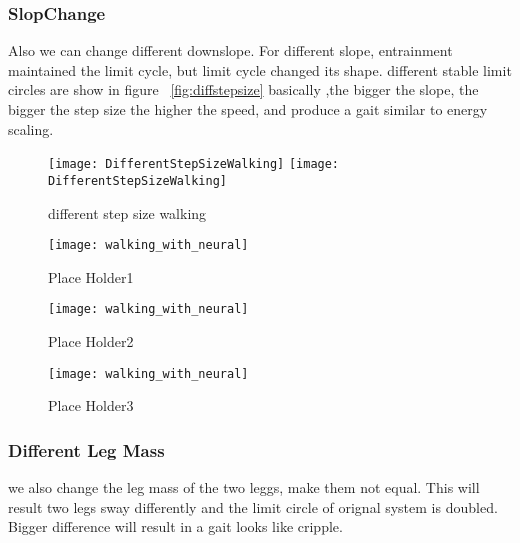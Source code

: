 \subsubsection*{SlopChange}
Also we can change different downslope.
For different slope, entrainment maintained the limit cycle, but limit cycle changed its shape.
different stable limit circles are show in figure ~\ref{fig:diffstepsize}
basically ,the bigger the slope, the bigger the step size the higher the speed, and produce a gait similar to energy scaling.

\begin{figure}[!htbp]
  \begin{center}
    \leavevmode
    \ifpdf
      \texttt{[image: DifferentStepSizeWalking]}
    \else
      \texttt{[image: DifferentStepSizeWalking]}
    \fi
    \caption{different step size walking}
    \label{fig:differentlr}
\end{center}
\end{figure}


\begin{figure}[!htbp]
  \begin{center}
      \texttt{[image: walking\_with\_neural]}
    \caption{Place Holder1}
    \label{fig:ss1}
\end{center}
\end{figure}

\begin{figure}[!htbp]
  \begin{center}
      \texttt{[image: walking\_with\_neural]}
    \caption{Place Holder2}
    \label{fig:ss2}
\end{center}
\end{figure}

\begin{figure}[!htbp]
  \begin{center}
      \texttt{[image: walking\_with\_neural]}
    \caption{Place Holder3}
    \label{fig:ss3}
\end{center}
\end{figure}




\subsubsection*{Different Leg Mass}
we also change the leg mass of the two leggs, make them not equal.
This will result two legs sway differently and the limit circle of orignal system is doubled.
Bigger difference will result in a gait looks like cripple.

